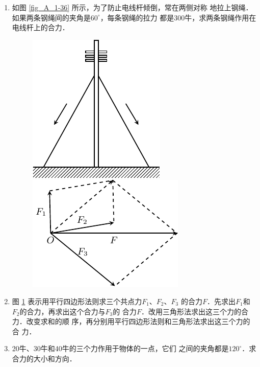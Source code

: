\begin{enumerate} 
\item   如图 \ref{fig_A_1-36} 所示，为了防止电线杆倾倒，常在两侧对称
地拉上钢绳．如果两条钢绳间的夹角是$60^\circ$，每条钢绳的拉力
都是300牛，求两条钢绳作用在电线杆上的合力．

\begin{figure} [htp]
\centering
\begin{minipage} [t]{0.48\textwidth} 
\centering
\includegraphics{fig/A/1-36.pdf} 
\caption{} \label{fig_A_1-36} 
\end{minipage} 
\begin{minipage} [t]{0.48\textwidth} 
\centering
\includegraphics{fig/A/1-37.pdf} 
\caption{} \label{fig_A_1-37} 
\end{minipage} 
\end{figure} 


\item  图 \ref{fig_A_1-37} 表示用平行四边形法则求三个共点力$F_1$、$F_2$、$F_3$
的合力$F$．先求出$F_1$和$F_2$的合力，再求出这个合力与$F_3$的
合力$F$．改用三角形法求出这三个力的合力．改变求和的顺
序，再分别用平行四边形法则和三角形法求出这三个力的合
力．



\item   20牛、30牛和40牛的三个力作用于物体的一点，它们
之间的夹角都是$120^\circ$．求合力的大小和方向．


\end{enumerate}
